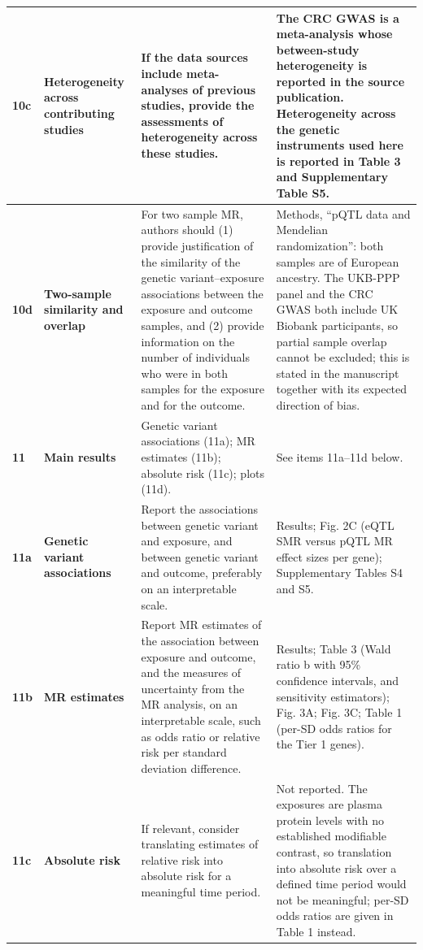 \documentclass[10pt,a4paper]{article}
\begin{document}
\begin{longtable}{@{}p{7mm}p{32mm}p{52mm}p{68mm}@{}}
\midrule
\textbf{10c} & \textbf{Heterogeneity across contributing studies} & If the data sources include meta-analyses of previous studies, provide the assessments of heterogeneity across these studies. & The CRC GWAS is a meta-analysis whose between-study heterogeneity is reported in the source publication. Heterogeneity across the genetic instruments used here is reported in Table 3 and Supplementary Table S5. \\
\midrule
\textbf{10d} & \textbf{Two-sample similarity and overlap} & For two sample MR, authors should (1) provide justification of the similarity of the genetic variant--exposure associations between the exposure and outcome samples, and (2) provide information on the number of individuals who were in both samples for the exposure and for the outcome. & Methods, ``pQTL data and Mendelian randomization'': both samples are of European ancestry. The UKB-PPP panel and the CRC GWAS both include UK Biobank participants, so partial sample overlap cannot be excluded; this is stated in the manuscript together with its expected direction of bias. \\
\midrule
\textbf{11} & \textbf{Main results} & Genetic variant associations (11a); MR estimates (11b); absolute risk (11c); plots (11d). & See items 11a--11d below. \\
\midrule
\textbf{11a} & \textbf{Genetic variant associations} & Report the associations between genetic variant and exposure, and between genetic variant and outcome, preferably on an interpretable scale. & Results; Fig. 2C (eQTL SMR versus pQTL MR effect sizes per gene); Supplementary Tables S4 and S5. \\
\midrule
\textbf{11b} & \textbf{MR estimates} & Report MR estimates of the association between exposure and outcome, and the measures of uncertainty from the MR analysis, on an interpretable scale, such as odds ratio or relative risk per standard deviation difference. & Results; Table 3 (Wald ratio b with 95\% confidence intervals, and sensitivity estimators); Fig. 3A; Fig. 3C; Table 1 (per-SD odds ratios for the Tier 1 genes). \\
\midrule
\textbf{11c} & \textbf{Absolute risk} & If relevant, consider translating estimates of relative risk into absolute risk for a meaningful time period. & Not reported. The exposures are plasma protein levels with no established modifiable contrast, so translation into absolute risk over a defined time period would not be meaningful; per-SD odds ratios are given in Table 1 instead. \\

\end{longtable}
\end{document}
